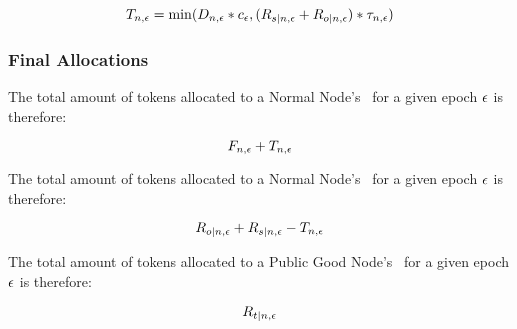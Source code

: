 \begin{equation}
    T_{n, \epsilon} =
    \min(D_{n, \epsilon}
    * c_{\epsilon} , (R_{s|n, \epsilon}
    + R_{o|n, \epsilon} ) 
    * \tau_{n, \epsilon})
\end{equation}

\subsubsection{Final Allocations}
\label{subsubsec:allocation}

The total amount of tokens allocated to a Normal Node's \operationPool\ for a given epoch $\epsilon$ is therefore:

\begin{equation}
    F_{n, \epsilon}
    + T_{n, \epsilon}
\end{equation}

The total amount of tokens allocated to a Normal Node's \stakingPool\ for a given epoch $\epsilon$ is therefore:

\begin{equation}
    R_{o|n, \epsilon}
    + R_{s|n, \epsilon}
    - T_{n, \epsilon}
\end{equation}

The total amount of tokens allocated to a Public Good Node's \publicGoodPool\ for a given epoch $\epsilon$ is therefore:

\begin{equation}
    R_{t|n, \epsilon}
\end{equation}
